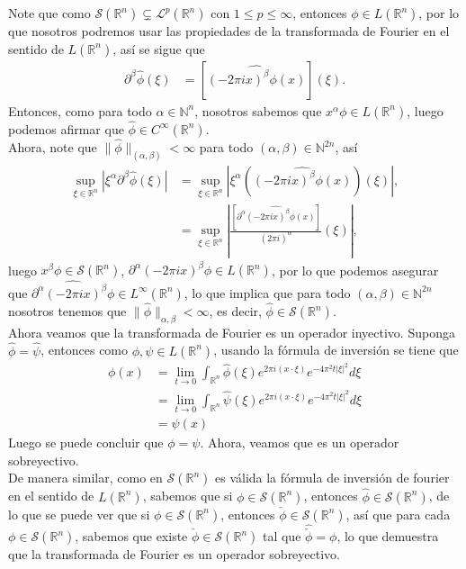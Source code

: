 \begin{homeworkProblem}
\begin{solution}
	    Note que como $\mathcal{S}(\mathbb{R}^n)\subsetneq \mathcal{L}^p(\mathbb{R}^n)$ con $1\leq p \leq \infty$, entonces $\phi\in L(\mathbb{R}^n)$, por lo que nosotros podremos usar las propiedades de la transformada de Fourier en el sentido de $L(\mathbb{R}^n)$, así se sigue que
	    \begin{align*}
	      \partial^{\beta}\hat{\phi}(\xi)&=[\hat{(-2\pi i x)^{\beta}\phi(x)}](\xi).
	    \end{align*}
      Entonces, como para todo $\alpha\in\mathbb{N}^{n}$, nosotros sabemos que $x^\alpha \phi \in L(\mathbb{R}^n)$, luego podemos afirmar que $\hat{\phi}\in C^{\infty}(\mathbb{R}^{n})$.\\
	    Ahora, note que $\|\hat{\phi}\|_{(\alpha,\beta)}<\infty$ para todo $(\alpha,\beta)\in\mathbb{N}^{2n}$, así
	    \begin{align*}
        \sup_{\xi\in\mathbb{R}^n}|\xi^{\alpha}\partial^{\beta}\hat{\phi}(\xi)|&= \sup_{\xi\in\mathbb{R}^n}|\xi^{\alpha}(\hat{(-2\pi i x)^{\beta}\phi(x)})(\xi)|,\\
        &= \sup_{\xi\in\mathbb{R}^n}\left|\frac{[\hat{\partial^{\alpha}(-2\pi i x)^{\beta}\phi(x)}]}{(2\pi i)^{\alpha}}(\xi)\right|,
	    \end{align*}
      luego $x^{\beta}\phi\in\mathcal{S}(\mathbb{R}^n)$, $\partial^{\alpha}(-2\pi ix)^{\beta}\phi\in L(\mathbb{R}^n)$, por lo que podemos asegurar que $\hat{\partial^{\alpha}(-2\pi ix)^{\beta}\phi}\in L^{\infty}(\mathbb{R}^n)$, lo que implica que para todo $(\alpha,\beta)\in\mathbb{N}^{2n}$ nosotros tenemos que $\|\hat{\phi}\|_{\alpha,\beta}<\infty$, es decir, $\hat{\phi}\in\mathcal{S}(\mathbb{R}^{n})$.\\
      Ahora veamos que la transformada de Fourier es un operador inyectivo.
      Suponga $\hat{\phi}=\hat{\psi}$, entonces como $\phi,\psi\in L(\mathbb{R}^n)$, usando la fórmula de inversión se tiene que
		  \begin{align*}
			  \phi(x)&=\lim_{t\rightarrow 0}\int_{\mathbb{R}^n}\hat{\phi}(\xi)e^{2\pi i (x\cdot \xi)}e^{-4\pi^2t|\xi|^2}d\xi\\
			  &=\lim_{t\rightarrow 0}\int_{\mathbb{R}^n}\hat{\psi}(\xi)e^{2\pi i (x\cdot \xi)}e^{-4\pi^2t|\xi|^2}d\xi\\
			  &=\psi(x)
		  \end{align*}
		  Luego se puede concluir que $\phi=\psi$.
		  Ahora, veamos que es un operador sobreyectivo.\\
      De manera similar, como en $\mathcal{S}(\mathbb{R}^{n})$ es válida la fórmula de inversión de fourier en el sentido de $L(\mathbb{R}^{n})$, sabemos que si $\phi\in\mathcal{S}(\mathbb{R}^n)$, entonces $\hat{\phi}\in\mathcal{S}(\mathbb{R}^n)$, de lo que se puede ver que si $\phi\in\mathcal{S}(\mathbb{R}^n)$, entonces $\check{\phi}\in\mathcal{S}(\mathbb{R}^n)$, así que para cada $\phi\in\mathcal{S}(\mathbb{R}^n)$, sabemos que existe $\check{\phi}\in\mathcal{S}(\mathbb{R}^n)$ tal que $\hat{\check{\phi}}=\phi$, lo que demuestra que la transformada de Fourier es un operador sobreyectivo.

\end{solution}
\end{homeworkProblem}
